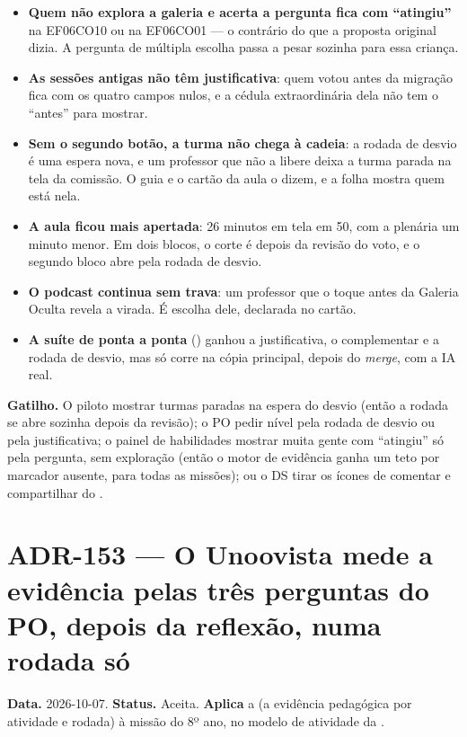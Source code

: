 \begin{itemize}
  \item \textbf{Quem não explora a galeria e acerta a pergunta fica com
    \enquote{atingiu}} na EF06CO10 ou na EF06CO01 --- o contrário do que a
    proposta original dizia. A pergunta de múltipla escolha passa a pesar
    sozinha para essa criança.
  \item \textbf{As sessões antigas não têm justificativa}: quem votou antes da
    migração fica com os quatro campos nulos, e a cédula extraordinária dela
    não tem o \enquote{antes} para mostrar.
  \item \textbf{Sem o segundo botão, a turma não chega à cadeia}: a rodada de
    desvio é uma espera nova, e um professor que não a libere deixa a turma
    parada na tela da comissão. O guia e o cartão da aula o dizem, e a folha
    mostra quem está nela.
  \item \textbf{A aula ficou mais apertada}: 26 minutos em tela em 50, com a
    plenária um minuto menor. Em dois blocos, o corte é depois da revisão do
    voto, e o segundo bloco abre pela rodada de desvio.
  \item \textbf{O podcast continua sem trava}: um professor que o toque antes
    da Galeria Oculta revela a virada. É escolha dele, declarada no cartão.
  \item \textbf{A suíte de ponta a ponta} () ganhou
    a justificativa, o complementar e a rodada de desvio, mas só corre na
    cópia principal, depois do \emph{merge}, com a IA real.
\end{itemize}

\textbf{Gatilho.} O piloto mostrar turmas paradas na espera do desvio (então
a rodada se abre sozinha depois da revisão); o PO pedir nível pela rodada de
desvio ou pela justificativa; o painel de habilidades mostrar muita gente com
\enquote{atingiu} só pela pergunta, sem exploração (então o motor de evidência
ganha um teto por marcador ausente, para todas as missões); ou o DS tirar os
ícones de comentar e compartilhar do .

\section{ADR-153 --- O Unoovista mede a evidência pelas três perguntas do PO, depois da reflexão, numa rodada só}
\label{adr:exp08ef1b-evidencia}

\textbf{Data.} 2026-10-07. \textbf{Status.} Aceita. \textbf{Aplica} a
 (a evidência pedagógica por atividade e rodada) à missão do 8º
ano, no modelo de atividade da .

